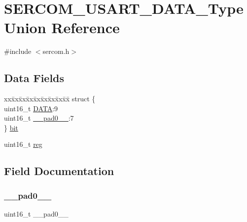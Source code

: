\hypertarget{union_s_e_r_c_o_m___u_s_a_r_t___d_a_t_a___type}{}\section{S\+E\+R\+C\+O\+M\+\_\+\+U\+S\+A\+R\+T\+\_\+\+D\+A\+T\+A\+\_\+\+Type Union Reference}
\label{union_s_e_r_c_o_m___u_s_a_r_t___d_a_t_a___type}


{\ttfamily \#include $<$sercom.\+h$>$}

\subsection*{Data Fields}
\begin{DoxyCompactItemize}
\item 
\begin{tabbing}
xx\=xx\=xx\=xx\=xx\=xx\=xx\=xx\=xx\=\kill
struct \{\\
\>uint16\_t \mbox{\hyperlink{union_s_e_r_c_o_m___u_s_a_r_t___d_a_t_a___type_acd1c79d588901607c16e8e825ec70487}{DATA}}:9\\
\>uint16\_t \mbox{\hyperlink{union_s_e_r_c_o_m___u_s_a_r_t___d_a_t_a___type_a77132c2c26a75f5b8751b235cda23828}{\_\_pad0\_\_}}:7\\
\} \mbox{\hyperlink{union_s_e_r_c_o_m___u_s_a_r_t___d_a_t_a___type_a903136ca7f1fdc2f7f2406635887af4c}{bit}}\\

\end{tabbing}\item 
uint16\+\_\+t \mbox{\hyperlink{union_s_e_r_c_o_m___u_s_a_r_t___d_a_t_a___type_a11760f5020019f4aa8cb02e694f7cc44}{reg}}
\end{DoxyCompactItemize}


\subsection{Field Documentation}
\mbox{\label{union_s_e_r_c_o_m___u_s_a_r_t___d_a_t_a___type_a77132c2c26a75f5b8751b235cda23828}} 
\subsubsection{\texorpdfstring{\_\_pad0\_\_}{\_\_pad0\_\_}}
{\footnotesize\ttfamily uint16\+\_\+t \+\_\+\+\_\+pad0\+\_\+\+\_\+}

